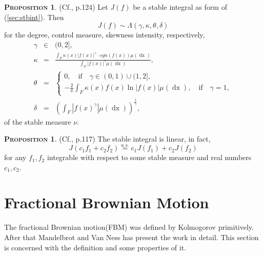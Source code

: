 \documentclass[a4paper, twoside, 11pt]{article}
\theoremstyle{definition}
\newtheorem{proposition}[definition]{\scshape Proposition}
\newcommand{\brkt}[1]{\left({#1} \right)}
\begin{document}
\begin{proposition}
  (Cf.\cite{samorodnitsky}, p.124) Let $J(f)$ be a stable integral as form of (\ref{sec:stbint}). Then 
  \begin{equation*}
	J(f) \sim \Lambda(\gamma, \kappa, \theta, \delta)
  \end{equation*}
for the degree, control measure, skewness intensity, respectively, 
\begin{eqnarray*}
\gamma &\in& (0, 2],\\
\kappa &=& \frac{\int_F \kappa(x) |f(x)|^\gamma\cdot sgn(f(x)) \mu(\mathop{dx})}{\int_F|f(x)|^\gamma\mu(\mathop{dx})},\\
\theta &=&
\begin{cases}
0 , \hspace{1em} \text{if} \hspace{1em} \gamma \in (0, 1) \cup (1, 2],\\
  -\frac{2}{\pi}\int_F \kappa(x) f(x) \ln|f(x)|\mu(\mathop{dx}), \hspace{1em} \text{if} \hspace{1em} \gamma = 1,
\end{cases}\\
\delta &=& \brkt{\int_F |f(x)^\gamma|\mu(\mathop{dx})}^{\frac{1}{\gamma}}, 
\end{eqnarray*}
of the stable measure $\nu$.
\label{sec:stbint2}
\end{proposition}
\begin{proposition}
(Cf.\cite{samorodnitsky}, p.117)  The stable integral is linear, in fact,
\begin{equation}
  J(c_1f_1 + c_2f_2) \overset{a.s.}{=}c_1J(f_1) + c_2J(f_2)
  \label{sec:stblin}
\end{equation}
for any $f_1, f_2$ integrable with respect to some stable measure and real numbers $c_1, c_2$. 
\end{proposition}
\newpage
\section{Fractional Brownian Motion}
\setcounter{equation}{0}
The fractional Brownian motion(FBM) was defined by Kolmogorov primitively. After that Mandelbrot and Van Ness has present the work in detail. This section is concerned with the definition and some properties of it.
\end{document}
